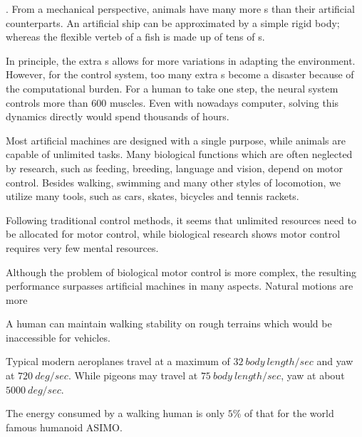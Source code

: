 \begin{itemize}
.
From a mechanical perspective, animals have many more {\dof}s than their artificial counterparts.
An artificial ship can be approximated by a simple rigid body; whereas the flexible verteb of a fish is made up of tens of {\dof}s.


In principle, the extra {\dof}s allows for more variations in adapting the environment. 
However, for the control system, too many extra {\dof}s become a disaster because of the computational burden. 
For a human to take one step,  the neural system controls more than $600$ muscles.
Even with nowadays computer, solving this dynamics directly would spend thousands of hours.

 
Most artificial machines are designed with a single purpose, while animals are capable  of unlimited tasks.
Many biological functions which are often neglected by \cms research, such as feeding, breeding, language and vision, depend on motor control. 
Besides walking, swimming and many other styles of locomotion, we utilize many tools, such as cars, skates, bicycles and tennis rackets.

Following traditional control methods, it seems that unlimited resources need to be  allocated for motor control, while biological research shows motor control requires very few mental resources.

Although the problem of biological motor control is more complex, the resulting performance surpasses artificial machines in many aspects.
Natural motions are more
\begin{enumerate} 

A human can maintain walking stability on rough terrains which would be inaccessible for vehicles.

Typical modern aeroplanes  travel at a maximum of $32\: body\: length/sec$ and yaw at $720\: deg/sec$.
While pigeons may travel at $75 \:body\: length / sec$, yaw at about  $5000 \: deg/sec$.

The energy consumed by a walking human  is only $5\%$ of that for the world famous humanoid ASIMO.
\end{enumerate}

\end{itemize}



